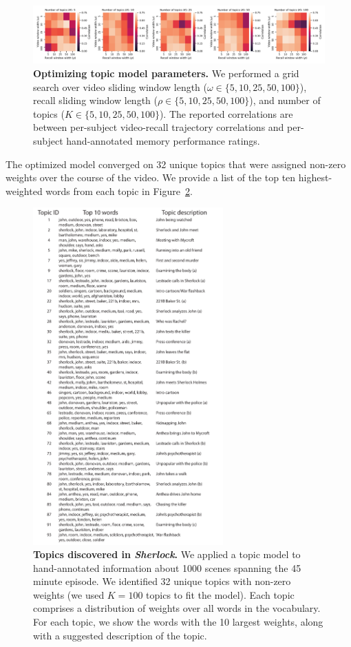 \documentclass{article}
\begin{document}
\begin{figure}[]
\centering
\includegraphics[width=1\textwidth]{figs/parameter_search}
\caption{\small \textbf{Optimizing topic model parameters.}  We performed a grid search over video sliding window length ($\omega \in \{5, 10, 25, 50, 100 \}$), recall sliding window length ($\rho \in \{5, 10, 25, 50, 100 \}$), and number of topics ($K \in \{5, 10, 25, 50, 100 \}$).  The reported correlations are between per-subject video-recall trajectory correlations and per-subject hand-annotated memory performance ratings.}
\label{fig:paramsearch}
\end{figure}

The optimized model converged on 32 unique topics that were assigned non-zero weights over the course of the video.  We provide a list of the top ten highest-weighted words from each topic in Figure~\ref{fig:topics}.

\begin{figure}[]
\centering
\includegraphics[width=0.65\textwidth]{figs/topic_words}
\caption{\small \textbf{Topics discovered in \textit{Sherlock}.} We applied a topic model to hand-annotated information about 1000 scenes spanning the 45 minute episode.  We identified 32 unique topics with non-zero weights (we used $K=100$ topics to fit the model).  Each topic comprises a distribution of weights over all words in the vocabulary.  For each topic, we show the words with the 10 largest weights, along with a suggested description of the topic.}
\label{fig:topics}
\end{figure}
\end{document}
